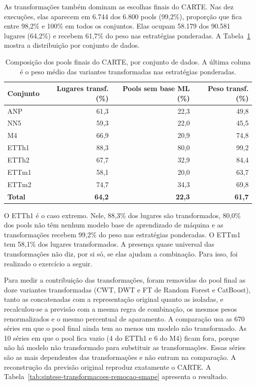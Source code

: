 As transformações também dominam as escolhas finais do CARTE. Nas dez execuções, elas aparecem em 6.744 dos 6.800 pools (99,2\%), proporção que fica entre 98,2\% e 100\% em todos os conjuntos. Elas ocupam 58.179 dos 90.581 lugares (64,2\%) e recebem 61,7\% do peso nas estratégias ponderadas. A Tabela~\ref{tab:sintese-transformacoes-escolhas} mostra a distribuição por conjunto de dados.

\begin{table}[H]
\centering
\caption[Composição dos pools finais do CARTE.]{Composição dos pools finais do CARTE, por conjunto de dados. A última coluna é o peso médio das variantes transformadas nas estratégias ponderadas.}
\label{tab:sintese-transformacoes-escolhas}
\small
\begin{tabular}{@{}lrrr@{}}
\toprule
\textbf{Conjunto} & \textbf{Lugares transf. (\%)} & \textbf{Pools sem base ML (\%)} & \textbf{Peso transf. (\%)} \\
\midrule
ANP    & 61,3 & 22,3 & 49,8 \\
NN5    & 59,3 & 22,0 & 45,5 \\
M4     & 66,9 & 20,9 & 74,8 \\
ETTh1  & 88,3 & 80,0 & 99,2 \\
ETTh2  & 67,7 & 32,9 & 84,4 \\
ETTm1  & 58,1 & 20,0 & 63,7 \\
ETTm2  & 74,7 & 34,3 & 69,8 \\
\midrule
\textbf{Total} & \textbf{64,2} & \textbf{22,3} & \textbf{61,7} \\
\bottomrule
\end{tabular}
\end{table}

O ETTh1 é o caso extremo. Nele, 88,3\% dos lugares são transformados, 80,0\% dos pools não têm nenhum modelo base de aprendizado de máquina e as transformações recebem 99,2\% do peso nas estratégias ponderadas. O ETTm1 tem 58,1\% dos lugares transformados. A presença quase universal das transformações não diz, por si só, se elas ajudam a combinação. Para isso, foi realizado o exercício a seguir.

Para medir a contribuição das transformações, foram removidas do pool final as doze variantes transformadas (CWT, DWT e FT de Random Forest e CatBoost), tanto as concatenadas com a representação original quanto as isoladas, e recalculou-se a previsão com a mesma regra de combinação, os mesmos pesos renormalizados e o mesmo percentual de aparamento. A comparação usa as 670 séries em que o pool final ainda tem ao menos um modelo não transformado. As 10 séries em que o pool fica vazio (4 do ETTh1 e 6 do M4) ficam fora, porque não há modelo não transformado para substituir as transformações. Essas séries são as mais dependentes das transformações e não entram na comparação. A reconstrução da previsão original reproduz exatamente o CARTE. A Tabela~\ref{tab:sintese-transformacoes-remocao-smape} apresenta o resultado.

